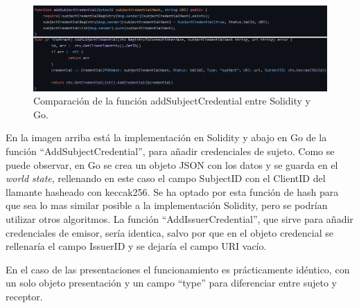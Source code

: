 \begin{figure}[H]
\centerline{\includegraphics[scale=0.60]{recursos/addsubjectcredential.png}}
\caption{Comparación de la función addSubjectCredential entre Solidity y Go.}
\label{add-credential-comp}
\end{figure}
En la imagen arriba está la implementación en Solidity y abajo en Go de la función ``AddSubjectCredential'', para añadir credenciales de sujeto. Como se puede observar, en Go se crea un objeto JSON con los datos y se guarda en el \textit{world state}, rellenando en este caso el campo SubjectID con el ClientID del llamante hasheado con keccak256. Se ha optado por esta función de hash para que sea lo mas similar posible a la implementación Solidity, pero se podrían utilizar otros algoritmos. La función ``AddIssuerCredential'', que sirve para añadir credenciales de emisor, sería identica, salvo por que en el objeto credencial se rellenaría el campo IssuerID y se dejaría el campo URI vacío.

En el caso de las presentaciones el funcionamiento es prácticamente idéntico, con un solo objeto presentación y un campo ``type'' para diferenciar entre sujeto y receptor.
